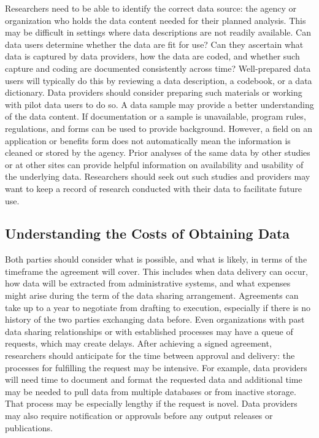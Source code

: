 Researchers need to be able to identify the correct data source: the agency or organization who holds the data content needed for their planned analysis. This may be difficult in settings where data descriptions are not readily available. Can data users determine whether the data are fit for use? Can they ascertain what data is captured by data providers, how the data are coded, and whether such capture and coding are documented consistently across time? Well-prepared data users will typically do this by reviewing a data description, a codebook, or a data dictionary. Data providers should consider preparing such materials or working with pilot data users to do so. A data sample may provide a better understanding of the data content. If documentation or a sample is unavailable, program rules, regulations, and forms can be used to provide background. However, a field on an application or benefits form does not automatically mean the information is cleaned or stored by the agency. Prior analyses of the same data by other studies or at other sites can provide helpful information on availability and usability of the underlying data. Researchers should seek out such studies and providers may want to keep a record of research conducted with their data to facilitate future use.

\hypertarget{understanding-the-costs-of-obtaining-data}{%
\subsection{Understanding the Costs of Obtaining Data}\label{understanding-the-costs-of-obtaining-data}}

Both parties should consider what is possible, and what is likely, in terms of the timeframe the agreement will cover. This includes when data delivery can occur, how data will be extracted from administrative systems, and what expenses might arise during the term of the data sharing arrangement. Agreements can take up to a year to negotiate from drafting to execution, especially if there is no history of the two parties exchanging data before. Even organizations with past data sharing relationships or with established processes may have a queue of requests, which may create delays. After achieving a signed agreement, researchers should anticipate for the time between approval and delivery: the processes for fulfilling the request may be intensive. For example, data providers will need time to document and format the requested data and additional time may be needed to pull data from multiple databases or from inactive storage. That process may be especially lengthy if the request is novel. Data providers may also require notification or approvals before any output releases or publications.

